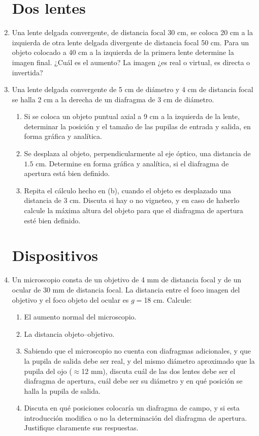 \documentclass[11pt,spanish,a4paper]{article}
\begin{document}
\begin{enumerate}
\section*{Dos lentes}

\item Una lente delgada convergente, de distancia focal 30 cm, se coloca
20 cm a la izquierda de otra lente delgada divergente de distancia
focal 50 cm. Para un objeto colocado a 40 cm a la izquierda de la
primera lente determine la imagen final. ¿Cuál es el aumento? La imagen
¿es real o virtual, es directa o invertida?


\item Una lente delgada convergente de 5 cm de diámetro y 4 cm de distancia
focal se halla 2 cm a la derecha de un diafragma de 3 cm de diámetro.
\begin{enumerate}
\item Si se coloca un objeto puntual axial a 9 cm a la izquierda de la lente,
determinar la posición y el tamaño de las pupilas de entrada y salida,
en forma gráfica y analítica.
\item Se desplaza al objeto, perpendicularmente al eje óptico, una distancia
de $1.5$ cm. Determine en forma gráfica y analítica, si el diafragma
de apertura está bien definido.
\item Repita el cálculo hecho en (b), cuando el objeto es desplazado una
distancia de 3 cm. Discuta si hay o no vigneteo, y en caso de haberlo
calcule la máxima altura del objeto para que el diafragma de apertura
esté bien definido.
\end{enumerate}



\section*{Dispositivos}
\item Un microscopio consta de un objetivo de 4 mm de distancia focal y
de un ocular de 30 mm de distancia focal. La distancia entre el foco
imagen del objetivo y el foco objeto del ocular es $g=$18 cm. Calcule:
\begin{enumerate}
\item El aumento normal del microscopio.
\item La distancia objeto--objetivo.
\item Sabiendo que el microscopio no cuenta con diafragmas adicionales,
y que la pupila de salida debe ser real, y del mismo diámetro aproximado
que la pupila del ojo ($\approx$12 mm), discuta cuál de las dos lentes
debe ser el diafragma de apertura, cuál debe ser su diámetro y en
qué posición se halla la pupila de salida.
\item Discuta en qué posiciones colocaría un diafragma de campo, y si esta
introducción modifica o no la determinación del diafragma de apertura.
Justifique claramente sus respuestas.
\end{enumerate}



\end{enumerate}
\end{document}
